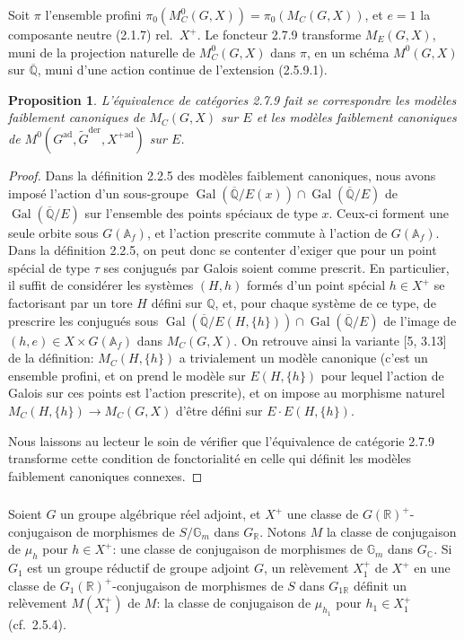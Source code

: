 \documentclass[12pt,a4paper]{article}
\theoremstyle{plain}
\newtheorem{proposition}[theorem]{Proposition}
\theoremstyle{definition}
\theoremstyle{remark}
\DeclareMathOperator{\Gal}{Gal}
\newcommand{\QQ}{\mathbb{Q}}
\newcommand{\RR}{\mathbb{R}}
\newcommand{\CC}{\mathbb{C}}
\newcommand{\Af}{\mathbb{A}_f}
\newcommand{\Gm}{\mathbb{G}}
\begin{document}
Soit $\pi$ l'ensemble profini $\pi_0(M^0_C(G,X)) = \pi_0(M_C(G,X))$, et $e = 1$ la composante neutre (2.1.7) rel.~$X^+$. Le foncteur 2.7.9 transforme $M_E(G,X)$, muni de la projection naturelle de $M^0_C(G,X)$ dans $\pi$, en un sch\'ema $M^0(G,X)$ sur $\overline{\QQ}$, muni d'une action continue de l'extension (2.5.9.1).

\begin{proposition}
L'\'equivalence de cat\'egories 2.7.9 fait se correspondre les mod\`eles faiblement canoniques de $M_C(G,X)$ sur $E$ et les mod\`eles faiblement canoniques de $M^0(G^{\text{ad}}, \tilde{G}^{\text{der}}, X^{+\text{ad}})$ sur $E$.
\end{proposition}

\begin{proof}
Dans la d\'efinition 2.2.5 des mod\`eles faiblement canoniques, nous avons impos\'e l'action d'un sous-groupe $\Gal(\overline{\QQ}/E(x)) \cap \Gal(\overline{\QQ}/E)$ de $\Gal(\overline{\QQ}/E)$ sur l'ensemble des points sp\'eciaux de type $x$. Ceux-ci forment une seule orbite sous $G(\Af)$, et l'action prescrite commute \`a l'action de $G(\Af)$. Dans la d\'efinition 2.2.5, on peut donc se contenter d'exiger que pour un point sp\'ecial de type $\tau$ ses conjugu\'es par Galois soient comme prescrit. En particulier, il suffit de consid\'erer les syst\`emes $(H,h)$ form\'es d'un point sp\'ecial $h \in X^+$ se factorisant par un tore $H$ d\'efini sur $\QQ$, et, pour chaque syst\`eme de ce type, de prescrire les conjugu\'es sous $\Gal(\overline{\QQ}/E(H,\{h\})) \cap \Gal(\overline{\QQ}/E)$ de l'image de $(h,e) \in X \times G(\Af)$ dans $M_C(G,X)$. On retrouve ainsi la variante [5, 3.13] de la d\'efinition: $M_C(H,\{h\})$ a trivialement un mod\`ele canonique (c'est un ensemble profini, et on prend le mod\`ele sur $E(H,\{h\})$ pour lequel l'action de Galois sur ces points est l'action prescrite), et on impose au morphisme naturel $M_C(H,\{h\}) \to M_C(G,X)$ d'\^etre d\'efini sur $E \cdot E(H,\{h\})$.

Nous laissons au lecteur le soin de v\'erifier que l'\'equivalence de cat\'egorie 2.7.9 transforme cette condition de fonctorialit\'e en celle qui d\'efinit les mod\`eles faiblement canoniques connexes.
\end{proof}

\subsubsection{}

Soient $G$ un groupe alg\'ebrique r\'eel adjoint, et $X^+$ une classe de $G(\RR)^+$-conjugaison de morphismes de $S/\Gm_m$ dans $G_{\RR}$. Notons $M$ la classe de conjugaison de $\mu_h$ pour $h \in X^+$: une classe de conjugaison de morphismes de $\Gm_m$ dans $G_{\CC}$. Si $G_1$ est un groupe r\'eductif de groupe adjoint $G$, un rel\`evement $X_1^+$ de $X^+$ en une classe de $G_1(\RR)^+$-conjugaison de morphismes de $S$ dans $G_{1\RR}$ d\'efinit un rel\`evement $M(X_1^+)$ de $M$: la classe de conjugaison de $\mu_{h_1}$ pour $h_1 \in X_1^+$ (cf.~2.5.4).
\end{document}

